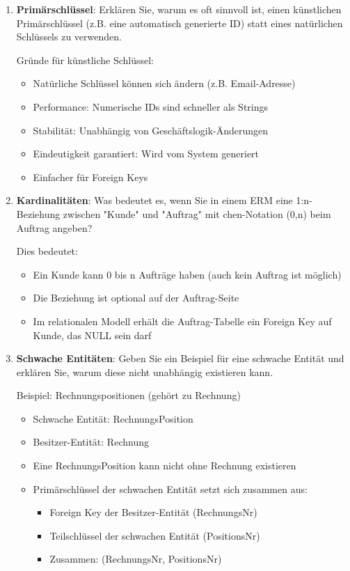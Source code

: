 \documentclass[a4paper]{article}
\begin{document}
\begin{enumerate}
    \item \textbf{Primärschlüssel}: Erklären Sie, warum es oft sinnvoll ist, einen künstlichen 
    Primärschlüssel (z.B. eine automatisch generierte ID) statt eines natürlichen Schlüssels zu verwenden.
    
    Gründe für künstliche Schlüssel:
    \begin{itemize}
        \item Natürliche Schlüssel können sich ändern (z.B. Email-Adresse)
        \item Performance: Numerische IDs sind schneller als Strings
        \item Stabilität: Unabhängig von Geschäftslogik-Änderungen
        \item Eindeutigkeit garantiert: Wird vom System generiert
        \item Einfacher für Foreign Keys
    \end{itemize}
    
    \item \textbf{Kardinalitäten}: Was bedeutet es, wenn Sie in einem ERM eine 1:n-Beziehung 
    zwischen "Kunde" und "Auftrag" mit chen-Notation (0,n) beim Auftrag angeben?
    
    Dies bedeutet:
    \begin{itemize}
        \item Ein Kunde kann 0 bis n Aufträge haben (auch kein Auftrag ist möglich)
        \item Die Beziehung ist optional auf der Auftrag-Seite
        \item Im relationalen Modell erhält die Auftrag-Tabelle ein Foreign Key auf Kunde, 
        das NULL sein darf
    \end{itemize}
    
    \newpage
    \item \textbf{Schwache Entitäten}: Geben Sie ein Beispiel für eine schwache Entität und erklären 
    Sie, warum diese nicht unabhängig existieren kann.
    
    Beispiel: Rechnungspositionen (gehört zu Rechnung)
    \begin{itemize}
        \item Schwache Entität: RechnungsPosition
        \item Besitzer-Entität: Rechnung
        \item Eine RechnungsPosition kann nicht ohne Rechnung existieren
        \item Primärschlüssel der schwachen Entität setzt sich zusammen aus:
        \begin{itemize}
            \item Foreign Key der Besitzer-Entität (RechnungsNr)
            \item Teilschlüssel der schwachen Entität (PositionsNr)
            \item Zusammen: (RechnungsNr, PositionsNr)
        \end{itemize}
    \end{itemize}
    

\end{enumerate}
\end{document}
